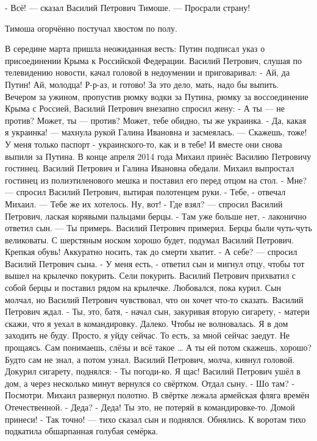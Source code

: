 - Всё! --- сказал Василий Петрович Тимоше. --- Просрали страну!

Тимоша огорчённо постучал хвостом по полу.

В середине марта пришла неожиданная весть: Путин подписал указ о присоединении Крыма к Российской Федерации.
Василий Петрович, слушая по телевидению новости, качал головой в недоумении и приговаривал:
- Ай, да Путин! Ай, молодца! Р-р-аз, и готово! За это дело, мать, надо бы выпить.
Вечером за ужином, пропустив рюмку водки за Путина, рюмку за воссоединение Крыма с Россией, Василий Петрович внезапно спросил жену:
- А ты --- не против? Может, ты --- против? Может, тебе обидно, ты же украинка.
- Да, какая я украинка! --- махнула рукой Галина Ивановна и засмеялась. --- Скажешь, тоже! У меня только паспорт - украинского-то, как и в тебе!
И вместе они снова выпили за Путина.
В конце апреля 2014 года Михаил принёс Василию Петровичу гостинец. Василий Петрович и Галина Ивановна обедали. Михаил выпростал гостинец из полиэтиленового мешка и поставил его перед отцом на стол.
- Мне? --- спросил Василий Петрович, вытирая полотенцем руки.
- Тебе, - отвечал Михаил. --- Тебе же их хотелось. Ну, вот!
- Где взял? --- спросил Василий Петрович, лаская корявыми пальцами берцы.
- Там уже больше нет, - лаконично ответил сын. --- Ты примерь.
Василий Петрович примерил. Берцы были чуть-чуть великоваты. С шерстяным носком хорошо будет, подумал Василий Петрович. Крепкая обувь! Аккуратно носить, так до смерти хватит.
- А себе? --- спросил Василий Петрович сына.
- У меня есть, - ответил сын и мигнул отцу, чтобы тот вышел на крылечко покурить.
Сели покурить. Василий Петрович прихватил с собой берцы и поставил рядом на крылечке. Любовался, пока курил. Сын молчал, но Василий Петрович чувствовал, что он хочет что-то сказать. Василий Петрович ждал.
- Ты, это, батя, - начал сын, закуривая вторую сигарету, -  матери скажи, что я уехал в командировку. Далеко. Чтобы не волновалась. Я в дом заходить не буду. Просто, я уйду сейчас. То есть, за мной сейчас заедут. Не прощаясь. Сам понимаешь, слёзы и всё такое … А ты ей потом скажешь, хорошо? Будто сам не знал, а потом узнал.
Василий Петрович, молча, кивнул головой. Докурил сигарету, поднялся:
- Ты погоди-ко. Я щас!
Василий Петрович ушёл в дом, а через несколько минут вернулся со свёртком. Отдал сыну.
- Шо там?
- Посмотри.
Михаил развернул полотно. В свёртке лежала армейская фляга времён Отечественной.
- Деда?
- Деда! Ты это, не потеряй в командировке-то. Домой принеси!
- Так точно! --- тихо сказал сын и поднялся. Обнялись. К воротам тихо подкатила обшарпанная голубая семёрка.
